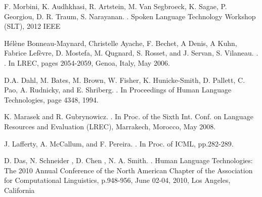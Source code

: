 \documentclass[11pt,letterpaper]{article}
\begin{document}
\begin{thebibliography}{}
F. Morbini, K. Audhkhasi, R. Artstein, M. Van Segbroeck, K. Sagae, P. Georgiou, D. R. Traum, S. Narayanan.
. 
\newblock Spoken Language Technology Workshop (SLT), 2012 IEEE

H\'{e}l\`{e}ne Bonneau-Maynard, Christelle Ayache, F. Bechet, A Denis, A Kuhn, Fabrice Lef\`{e}vre, D. Mostefa, M. Qugnard, S. Rosset, and J. Servan, S. Vilaneau. 
. 
.
\newblock In LREC, pages 2054-2059, Genoa, Italy, May 2006.

D.A. Dahl, M. Bates, M. Brown, W. Fisher, K. Hunicke-Smith, D. Pallett, C. Pao, A. Rudnicky, and E. Shriberg.
. 
\newblock In Proceedings of Human Language Technologies, page 4348, 1994.

K. Marasek and R. Gubrynowicz. 
. 
\newblock In Proc. of the Sixth Int. Conf. on Language Resources and Evaluation (LREC), Marrakech, Morocco, May 2008.

J. Lafferty, A. McCallum, and F. Pereira.
. 
\newblock In Proc. of ICML, pp.282-289.

D. Das, N. Schneider , D. Chen , N. A. Smith. 
. 
\newblock Human Language Technologies: The 2010 Annual Conference of the North American Chapter of the Association for Computational Linguistics, p.948-956, June 02-04, 2010, Los Angeles, California


\end{thebibliography}
\end{document}
